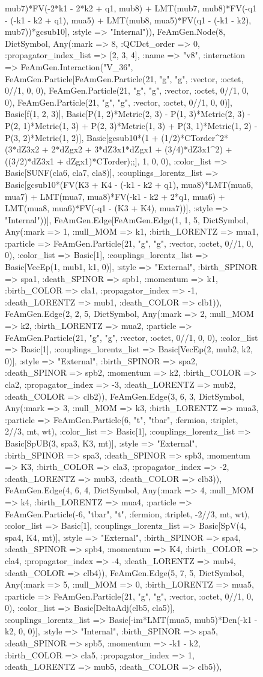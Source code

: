 \documentclass{revtex4}
\begin{document}
\begin{figure}[!htb]
\begin{center}
{mub7)*FV(-2*k1 - 2*k2 + q1, mub8) + LMT(mub7, mub8)*FV(-q1 - (-k1 - k2 + q1), mua5) + LMT(mub8, mua5)*FV(q1 - (-k1 - k2), mub7))*gcsub10], :style => "Internal")), FeAmGen.Node(8, Dict{Symbol, Any}(:mark => 8, :QCDct_order => 0, :propagator_index_list => [2, 3, 4], :name => "v8", :interaction => FeAmGen.Interaction("V_36", FeAmGen.Particle[FeAmGen.Particle(21, "g", "g", :vector, :octet, 0//1, 0, 0), FeAmGen.Particle(21, "g", "g", :vector, :octet, 0//1, 0, 0), FeAmGen.Particle(21, "g", "g", :vector, :octet, 0//1, 0, 0)], Basic[f(1, 2, 3)], Basic[P(1, 2)*Metric(2, 3) - P(1, 3)*Metric(2, 3) - P(2, 1)*Metric(1, 3) + P(2, 3)*Metric(1, 3) + P(3, 1)*Metric(1, 2) - P(3, 2)*Metric(1, 2)], Basic[gcsub10*(1 + (1/2)*CTorder^2*(3*dZ3x2 + 2*dZgx2 + 3*dZ3x1*dZgx1 + (3/4)*dZ3x1^2) + ((3/2)*dZ3x1 + dZgx1)*CTorder);;], 1, 0, 0), :color_list => Basic[SUNF(cla6, cla7, cla8)], :couplings_lorentz_list => Basic[gcsub10*(FV(K3 + K4 - (-k1 - k2 + q1), mua8)*LMT(mua6, mua7) + LMT(mua7, mua8)*FV(-k1 - k2 + 2*q1, mua6) + LMT(mua8, mua6)*FV(-q1 - (K3 + K4), mua7))], :style => "Internal"))], FeAmGen.Edge[FeAmGen.Edge(1, 1, 5, Dict{Symbol, Any}(:mark => 1, :null_MOM => k1, :birth_LORENTZ => mua1, :particle => FeAmGen.Particle(21, "g", "g", :vector, :octet, 0//1, 0, 0), :color_list => Basic[1], :couplings_lorentz_list => Basic[VecEp(1, mub1, k1, 0)], :style => "External", :birth_SPINOR => spa1, :death_SPINOR => spb1, :momentum => k1, :birth_COLOR => cla1, :propagator_index => -1, :death_LORENTZ => mub1, :death_COLOR => clb1)), FeAmGen.Edge(2, 2, 5, Dict{Symbol, Any}(:mark => 2, :null_MOM => k2, :birth_LORENTZ => mua2, :particle => FeAmGen.Particle(21, "g", "g", :vector, :octet, 0//1, 0, 0), :color_list => Basic[1], :couplings_lorentz_list => Basic[VecEp(2, mub2, k2, 0)], :style => "External", :birth_SPINOR => spa2, :death_SPINOR => spb2, :momentum => k2, :birth_COLOR => cla2, :propagator_index => -3, :death_LORENTZ => mub2, :death_COLOR => clb2)), FeAmGen.Edge(3, 6, 3, Dict{Symbol, Any}(:mark => 3, :null_MOM => k3, :birth_LORENTZ => mua3, :particle => FeAmGen.Particle(6, "t", "tbar", :fermion, :triplet, 2//3, mt, wt), :color_list => Basic[1], :couplings_lorentz_list => Basic[SpUB(3, spa3, K3, mt)], :style => "External", :birth_SPINOR => spa3, :death_SPINOR => spb3, :momentum => K3, :birth_COLOR => cla3, :propagator_index => -2, :death_LORENTZ => mub3, :death_COLOR => clb3)), FeAmGen.Edge(4, 6, 4, Dict{Symbol, Any}(:mark => 4, :null_MOM => k4, :birth_LORENTZ => mua4, :particle => FeAmGen.Particle(-6, "tbar", "t", :fermion, :triplet, -2//3, mt, wt), :color_list => Basic[1], :couplings_lorentz_list => Basic[SpV(4, spa4, K4, mt)], :style => "External", :birth_SPINOR => spa4, :death_SPINOR => spb4, :momentum => K4, :birth_COLOR => cla4, :propagator_index => -4, :death_LORENTZ => mub4, :death_COLOR => clb4)), FeAmGen.Edge(5, 7, 5, Dict{Symbol, Any}(:mark => 5, :null_MOM => 0, :birth_LORENTZ => mua5, :particle => FeAmGen.Particle(21, "g", "g", :vector, :octet, 0//1, 0, 0), :color_list => Basic[DeltaAdj(clb5, cla5)], :couplings_lorentz_list => Basic[-im*LMT(mua5, mub5)*Den(-k1 - k2, 0, 0)], :style => "Internal", :birth_SPINOR => spa5, :death_SPINOR => spb5, :momentum => -k1 - k2, :birth_COLOR => cla5, :propagator_index => 1, :death_LORENTZ => mub5, :death_COLOR => clb5)), }
\end{center}
\end{figure}
\end{document}
